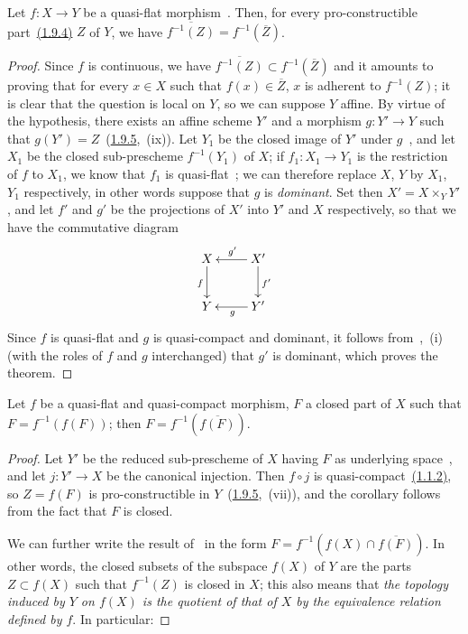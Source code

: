 \begin{theorem}[2.3.10]
\label{IV.2.3.10}
Let $f:X\to Y$ be a quasi-flat morphism~.
Then, for every pro-constructible part~{\hyperref[IV.1.9.4]{(1.9.4)}} $Z$ of $Y$, we have $\overline{f^{-1}(Z)}=f^{-1}(\overline{Z})$.
\end{theorem}

\begin{proof}
Since $f$ is continuous, we have $\overline{f^{-1}(Z)}\subset f^{-1}(\overline{Z})$ and it amounts to proving that for every $x\in X$ such that $f(x)\in\overline{Z}$, $x$ is adherent to $f^{-1}(Z)$;
it is clear that the question is local on $Y$, so we can suppose $Y$ affine.
By virtue of the hypothesis, there exists an affine scheme $Y'$ and a morphism $g:Y'\to Y$ such that $g(Y')=Z$~({\hyperref[IV.1.9.5]{1.9.5}},~(ix)).
Let $Y_1$ be the closed image of $Y'$ under $g$~, and let $X_1$ be the closed sub-prescheme $f^{-1}(Y_1)$ of $X$; if $f_1:X_1\to Y_1$ is the restriction of $f$ to $X_1$, we know that $f_1$ is quasi-flat~; we can therefore replace $X$, $Y$ by $X_1$, $Y_1$ respectively, in other words suppose that $g$ is \emph{dominant}.
Set then $X'=X\times_Y Y'$, and let $f'$ and $g'$ be the projections of $X'$ into $Y'$ and $X$ respectively, so that we have the commutative diagram
\[
\xymatrix{
  X \ar[d]_f & X' \ar[l]_{g'} \ar[d]^{f'} \\
  Y & Y' \ar[l]^g
}
\]
Since $f$ is quasi-flat and $g$ is quasi-compact and dominant, it follows from~,~(i) (with the roles of $f$ and $g$ interchanged) that $g'$ is dominant, which proves the theorem.
\end{proof}

\begin{corollary}[2.3.11]
\label{IV.2.3.11}
Let $f$ be a quasi-flat and quasi-compact morphism, $F$ a closed part of $X$ such that $F=f^{-1}(f(F))$; then $F=f^{-1}(\overline{f(F)})$.
\end{corollary}

\begin{proof}
Let $Y'$ be the reduced sub-prescheme of $X$ having $F$ as underlying space~, and let $j:Y'\to X$ be the canonical injection.
Then $f\circ j$ is quasi-compact~{\hyperref[IV.1.1.2]{(1.1.2)}}, so $Z=f(F)$ is pro-constructible in $Y$~({\hyperref[IV.1.9.5]{1.9.5}},~(vii)), and the corollary follows from the fact that $F$ is closed.

We can further write the result of~ in the form $F=f^{-1}(f(X)\cap\overline{f(F)})$.
In other words, the closed subsets of the subspace $f(X)$ of $Y$ are the parts $Z\subset f(X)$ such that $f^{-1}(Z)$ is closed in $X$; this also means that \emph{the topology induced by $Y$ on $f(X)$ is the quotient of that of $X$ by the equivalence relation defined by $f$}.
In particular:
\end{proof}

